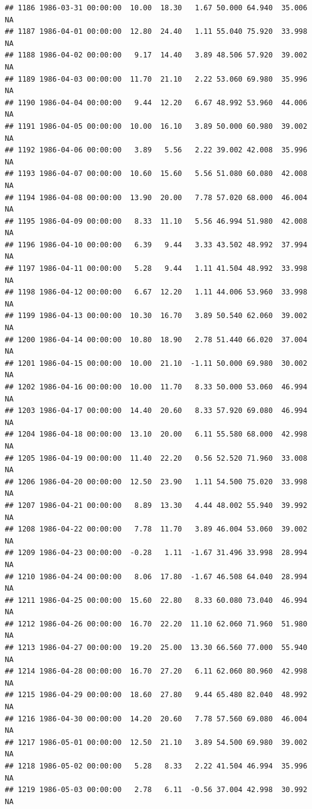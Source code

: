 \documentclass{article}\usepackage{graphicx, color}
\makeatletter
\newenvironment{kframe}{%
 \def\at@end@of@kframe{}%
 \ifinner\ifhmode%
  \def\at@end@of@kframe{\end{minipage}}%
  \begin{minipage}{\columnwidth}%
 \fi\fi%
 \def\FrameCommand##1{\hskip\@totalleftmargin \hskip-\fboxsep
 \colorbox{shadecolor}{##1}\hskip-\fboxsep
     \hskip-\linewidth \hskip-\@totalleftmargin \hskip\columnwidth}%
 \MakeFramed {\advance\hsize-\width
   \@totalleftmargin\z@ \linewidth\hsize
   \@setminipage}}%
 {\par\unskip\endMakeFramed%
 \at@end@of@kframe}
\newenvironment{knitrout}{}{} %
\makeatother
\begin{document}
\begin{knitrout}
\begin{kframe}
\begin{verbatim}
## 1186 1986-03-31 00:00:00  10.00  18.30   1.67 50.000 64.940  35.006     NA
## 1187 1986-04-01 00:00:00  12.80  24.40   1.11 55.040 75.920  33.998     NA
## 1188 1986-04-02 00:00:00   9.17  14.40   3.89 48.506 57.920  39.002     NA
## 1189 1986-04-03 00:00:00  11.70  21.10   2.22 53.060 69.980  35.996     NA
## 1190 1986-04-04 00:00:00   9.44  12.20   6.67 48.992 53.960  44.006     NA
## 1191 1986-04-05 00:00:00  10.00  16.10   3.89 50.000 60.980  39.002     NA
## 1192 1986-04-06 00:00:00   3.89   5.56   2.22 39.002 42.008  35.996     NA
## 1193 1986-04-07 00:00:00  10.60  15.60   5.56 51.080 60.080  42.008     NA
## 1194 1986-04-08 00:00:00  13.90  20.00   7.78 57.020 68.000  46.004     NA
## 1195 1986-04-09 00:00:00   8.33  11.10   5.56 46.994 51.980  42.008     NA
## 1196 1986-04-10 00:00:00   6.39   9.44   3.33 43.502 48.992  37.994     NA
## 1197 1986-04-11 00:00:00   5.28   9.44   1.11 41.504 48.992  33.998     NA
## 1198 1986-04-12 00:00:00   6.67  12.20   1.11 44.006 53.960  33.998     NA
## 1199 1986-04-13 00:00:00  10.30  16.70   3.89 50.540 62.060  39.002     NA
## 1200 1986-04-14 00:00:00  10.80  18.90   2.78 51.440 66.020  37.004     NA
## 1201 1986-04-15 00:00:00  10.00  21.10  -1.11 50.000 69.980  30.002     NA
## 1202 1986-04-16 00:00:00  10.00  11.70   8.33 50.000 53.060  46.994     NA
## 1203 1986-04-17 00:00:00  14.40  20.60   8.33 57.920 69.080  46.994     NA
## 1204 1986-04-18 00:00:00  13.10  20.00   6.11 55.580 68.000  42.998     NA
## 1205 1986-04-19 00:00:00  11.40  22.20   0.56 52.520 71.960  33.008     NA
## 1206 1986-04-20 00:00:00  12.50  23.90   1.11 54.500 75.020  33.998     NA
## 1207 1986-04-21 00:00:00   8.89  13.30   4.44 48.002 55.940  39.992     NA
## 1208 1986-04-22 00:00:00   7.78  11.70   3.89 46.004 53.060  39.002     NA
## 1209 1986-04-23 00:00:00  -0.28   1.11  -1.67 31.496 33.998  28.994     NA
## 1210 1986-04-24 00:00:00   8.06  17.80  -1.67 46.508 64.040  28.994     NA
## 1211 1986-04-25 00:00:00  15.60  22.80   8.33 60.080 73.040  46.994     NA
## 1212 1986-04-26 00:00:00  16.70  22.20  11.10 62.060 71.960  51.980     NA
## 1213 1986-04-27 00:00:00  19.20  25.00  13.30 66.560 77.000  55.940     NA
## 1214 1986-04-28 00:00:00  16.70  27.20   6.11 62.060 80.960  42.998     NA
## 1215 1986-04-29 00:00:00  18.60  27.80   9.44 65.480 82.040  48.992     NA
## 1216 1986-04-30 00:00:00  14.20  20.60   7.78 57.560 69.080  46.004     NA
## 1217 1986-05-01 00:00:00  12.50  21.10   3.89 54.500 69.980  39.002     NA
## 1218 1986-05-02 00:00:00   5.28   8.33   2.22 41.504 46.994  35.996     NA
## 1219 1986-05-03 00:00:00   2.78   6.11  -0.56 37.004 42.998  30.992     NA

\end{verbatim}
\end{kframe}
\end{knitrout}
\end{document}
